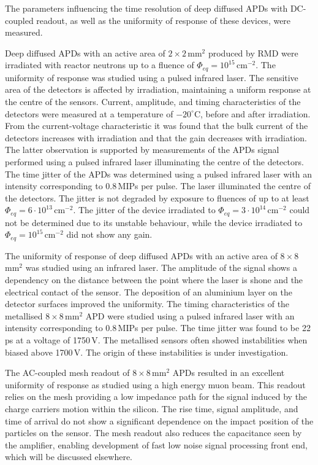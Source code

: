 \documentclass[3p,preprint,twocolumn]{elsarticle}
\begin{document}
The parameters influencing the time resolution of deep diffused APDs with DC-coupled readout, as well as the uniformity of response of these devices, were measured.

Deep diffused APDs with an active area of $2 \times 2$\,mm$^2$ produced by RMD were irradiated with reactor neutrons up to a fluence of $\Phi_{eq} = 10^{15}$\,cm$^{-2}$.
The uniformity of response was studied using a pulsed infrared laser.
The sensitive area of the detectors is affected by irradiation, maintaining a uniform response at the centre of the sensors.
Current, amplitude, and timing characteristics of the detectors were measured at a temperature of $-20^\circ$C, before and after irradiation.
From the current-voltage characteristic it was found that the bulk current of the detectors increases with irradiation and that the gain decreases with irradiation.
The latter observation is supported by measurements of the APDs signal performed using a pulsed infrared laser illuminating the centre of the detectors.
The time jitter of the APDs was determined using a pulsed infrared laser with an intensity corresponding to 0.8\,MIPs per pulse.
The laser illuminated the centre of the detectors.
The jitter is not degraded by exposure to fluences of up to at least $\Phi_{eq} = 6 \cdot 10^{13}$\,cm$^{-2}$.
The jitter of the device irradiated to $\Phi_{eq} = 3 \cdot 10^{14}$\,cm$^{-2}$ could not be determined due to its unstable behaviour, while the device irradiated to $\Phi_{eq} = 10^{15}$\,cm$^{-2}$ did not show any gain.

The uniformity of response of deep diffused APDs with an active area of $8 \times 8$\,mm$^2$ was studied using an infrared laser.
The amplitude of the signal shows a dependency on the distance between the point where the laser is shone and the electrical contact of the sensor.
The deposition of an aluminium layer on the detector surfaces improved the uniformity.
The timing characteristics of the metallised $8 \times 8$\,mm$^2$ APD were studied using a pulsed infrared laser with an intensity corresponding to 0.8\,MIPs per pulse.
The time jitter was found to be 22\,ps at a voltage of 1750\,V.
The metallised sensors often showed instabilities when biased above 1700\,V.
The origin of these instabilities is under investigation.

The AC-coupled mesh readout of $8 \times 8$\,mm$^2$ APDs resulted in an excellent uniformity of response as studied using a high energy muon beam.
This readout relies on the mesh providing a low impedance path for the signal induced by the charge carriers motion within the silicon.
The rise time, signal amplitude, and time of arrival do not show a significant dependence on the impact position of the particles on the sensor.
The mesh readout also reduces the capacitance seen by the amplifier, enabling development of fast low noise signal processing front end, which will be discussed elsewhere.
\end{document}
